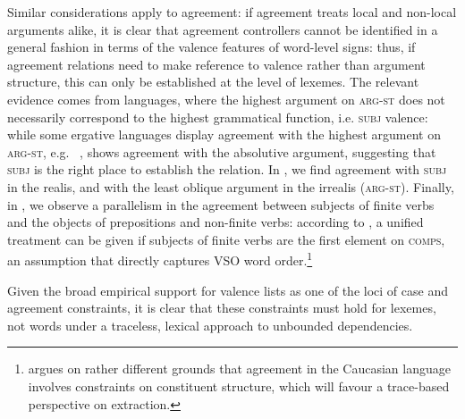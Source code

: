 \documentclass[output=paper
,notxmath 
 	        ,biblatex
                ,babelshorthands
                ,newtxmath
                ,draftmode
                ,colorlinks, citecolor=brown
]{langscibook}
\begin{document}
Similar considerations apply to agreement: if agreement treats local
and non-local arguments alike, it is clear that agreement controllers
cannot be identified in a general fashion in terms of the valence
features of word-level signs: thus, if agreement relations need to make
reference to valence rather than argument structure, this can only be
established at the level of lexemes. The relevant evidence comes from
languages, where the highest argument on \textsc{arg-st} does not
necessarily correspond to the highest grammatical function, i.e.
\textsc{subj} valence: while some ergative languages display agreement
with the highest argument on \textsc{arg-st}, e.g.\ 
\citep{harris_a84udi},  \citep{kibrik94:_archi} shows agreement
with the absolutive argument, suggesting that \textsc{subj} is the
right place to establish the relation. %
In  \citep{Crysmann:09}, we find agreement with \textsc{subj} in the realis, and with
the least oblique argument in the irrealis (\textsc{arg-st}). Finally,
in , we observe a parallelism in the agreement between subjects
of finite verbs and the objects of prepositions and non-finite verbs:
according to \citet[Section~4]{Borsley89}, a unified treatment can be given if
subjects of finite verbs are the first element on \textsc{comps}, an
assumption that directly captures  VSO word order.\footnote{
  \citet[Section~5.4]{Borsley:16:Archi} argues on rather different grounds that
  agreement in the Caucasian language  involves constraints on
  constituent structure, which will favour a trace-based perspective on
  extraction. }

Given the broad empirical support for valence lists as one of the loci
of case and agreement constraints, it is clear that these constraints
must hold for lexemes, not words under a traceless, lexical
approach to unbounded dependencies.





\end{document}
